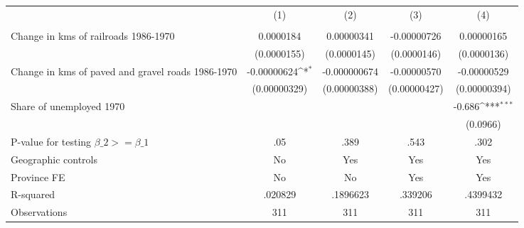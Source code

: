 {
\def\sym#1{\ifmmode^{#1}\else\(^{#1}\)\fi}
\begin{tabular}{l*{4}{c}}
\hline\hline
                &\multicolumn{1}{c}{(1)}&\multicolumn{1}{c}{(2)}&\multicolumn{1}{c}{(3)}&\multicolumn{1}{c}{(4)}\\
                &\multicolumn{1}{c}{}&\multicolumn{1}{c}{}&\multicolumn{1}{c}{}&\multicolumn{1}{c}{}\\
\hline
Change in kms of railroads 1986-1970&0.0000184         &0.00000341         &-0.00000726         &0.00000165         \\
                &(0.0000155)         &(0.0000145)         &(0.0000146)         &(0.0000136)         \\
[1em]
Change in kms of paved and gravel roads 1986-1970&-0.00000624\sym{*}  &-0.000000674         &-0.00000570         &-0.00000529         \\
                &(0.00000329)         &(0.00000388)         &(0.00000427)         &(0.00000394)         \\
[1em]
Share of unemployed 1970&                  &                  &                  &   -0.686\sym{***}\\
                &                  &                  &                  & (0.0966)         \\
\hline
P-value for testing $\beta\_{2} >= \beta\_{1}$&      .05         &     .389         &     .543         &     .302         \\
Geographic controls&       No         &      Yes         &      Yes         &      Yes         \\
Province FE     &       No         &       No         &      Yes         &      Yes         \\
R-squared       &  .020829         & .1896623         &  .339206         & .4399432         \\
Observations    &      311         &      311         &      311         &      311         \\
\hline\hline
\end{tabular}
}
